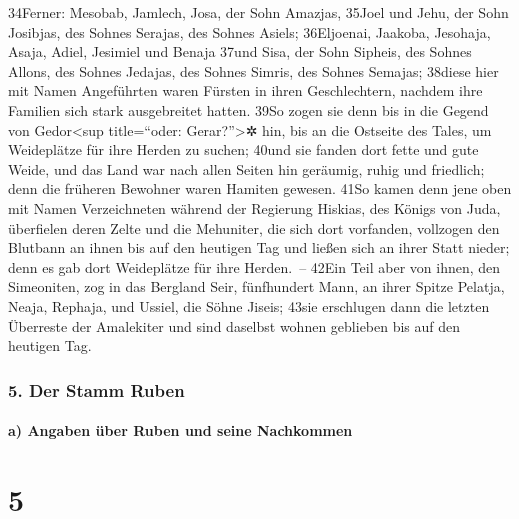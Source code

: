 34Ferner: Mesobab, Jamlech, Josa, der Sohn Amazjas, 35Joel und Jehu, der
Sohn Josibjas, des Sohnes Serajas, des Sohnes Asiels; 36Eljoenai,
Jaakoba, Jesohaja, Asaja, Adiel, Jesimiel und Benaja 37und Sisa, der
Sohn Sipheis, des Sohnes Allons, des Sohnes Jedajas, des Sohnes Simris,
des Sohnes Semajas; 38diese hier mit Namen Angeführten waren Fürsten in
ihren Geschlechtern, nachdem ihre Familien sich stark ausgebreitet
hatten. 39So zogen sie denn bis in die Gegend von Gedor\textless sup
title=``oder: Gerar?''\textgreater✲ hin, bis an die Ostseite des Tales,
um Weideplätze für ihre Herden zu suchen; 40und sie fanden dort fette
und gute Weide, und das Land war nach allen Seiten hin geräumig, ruhig
und friedlich; denn die früheren Bewohner waren Hamiten gewesen. 41So
kamen denn jene oben mit Namen Verzeichneten während der Regierung
Hiskias, des Königs von Juda, überfielen deren Zelte und die Mehuniter,
die sich dort vorfanden, vollzogen den Blutbann an ihnen bis auf den
heutigen Tag und ließen sich an ihrer Statt nieder; denn es gab dort
Weideplätze für ihre Herden.~-- 42Ein Teil aber von ihnen, den
Simeoniten, zog in das Bergland Seir, fünfhundert Mann, an ihrer Spitze
Pelatja, Neaja, Rephaja, und Ussiel, die Söhne Jiseis; 43sie erschlugen
dann die letzten Überreste der Amalekiter und sind daselbst wohnen
geblieben bis auf den heutigen Tag.

\hypertarget{der-stamm-ruben}{%
\subsubsection{5. Der Stamm Ruben}\label{der-stamm-ruben}}

\hypertarget{a-angaben-uxfcber-ruben-und-seine-nachkommen}{%
\paragraph{a) Angaben über Ruben und seine
Nachkommen}\label{a-angaben-uxfcber-ruben-und-seine-nachkommen}}

\hypertarget{section-4}{%
\section{5}\label{section-4}}

